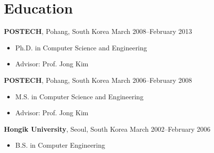 \section*{Education}

\begin{description}
\item {\bf POSTECH}, Pohang, South Korea \dotfill March 2008--February 2013
  \begin{itemize}
  \item Ph.D. in Computer Science and Engineering
  \item Advisor: Prof. Jong Kim
  \end{itemize}
  
\item {\bf POSTECH}, Pohang, South Korea \dotfill March 2006--February 2008
  \begin{itemize}
  \item M.S. in Computer Science and Engineering
  \item Advisor: Prof. Jong Kim
  \end{itemize}

\item {\bf Hongik University}, Seoul, South Korea \dotfill March 2002--February 2006
  \begin{itemize}
  \item B.S. in Computer Engineering 
  \end{itemize}
\end{description}
